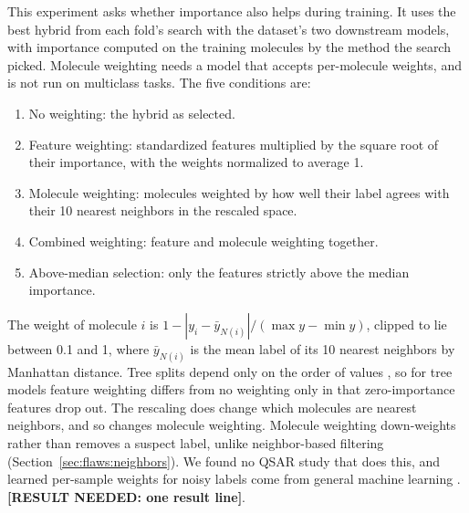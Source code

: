 This experiment asks whether importance also helps during training. %
It uses the best hybrid from each fold's search with the dataset's two downstream models, with importance computed on the training molecules by the method the search picked. Molecule weighting needs a model that accepts per-molecule weights, and is not run on multiclass tasks. The five conditions are:
\begin{enumerate}[leftmargin=*]
    \item No weighting: the hybrid as selected.
    \item Feature weighting: standardized features multiplied by the square root of their importance, with the weights normalized to average 1.
    \item Molecule weighting: molecules weighted by how well their label agrees with their 10 nearest neighbors in the rescaled space.
    \item Combined weighting: feature and molecule weighting together.
    \item Above-median selection: only the features strictly above the median importance.
\end{enumerate}
The weight of molecule $i$ is $1 - |y_i - \bar y_{N(i)}| / (\max y - \min y)$, clipped to lie between 0.1 and 1, where $\bar y_{N(i)}$ is the mean label of its 10 nearest neighbors by Manhattan distance. Tree splits depend only on the order of values \citep{Hastie2009}, so for tree models feature weighting differs from no weighting only in that zero-importance features drop out. The rescaling does change which molecules are nearest neighbors, and so changes molecule weighting. Molecule weighting down-weights rather than removes a suspect label, unlike neighbor-based filtering (Section~\ref{sec:flaws:neighbors}). We found no QSAR study that does this, and learned per-sample weights for noisy labels come from general machine learning \citep{shu2019metaweightnet}. \textbf{[RESULT NEEDED: one result line]}.


